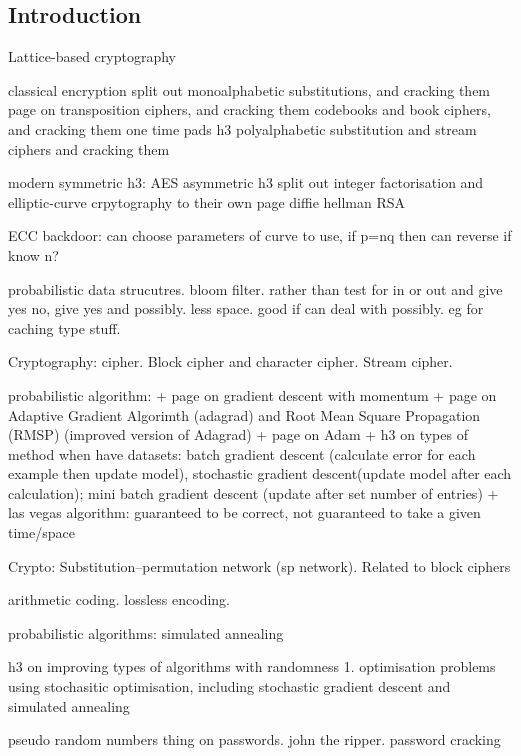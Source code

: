 
\subsection{Introduction}

Lattice-based cryptography

classical encryption
	split out monoalphabetic substitutions, and cracking them
	page on transposition ciphers, and cracking them
	codebooks and book ciphers, and cracking them
	one time pads
h3 polyalphabetic substitution and stream ciphers and cracking them

modern symmetric h3:
	AES
asymmetric h3
	split out integer factorisation and elliptic-curve crpytography to their own page
	diffie hellman
	RSA

ECC backdoor: can choose parameters of curve to use, if p=nq then can reverse if know n?


probabilistic data strucutres.
bloom filter.
rather than test for in or out and give yes no, give yes and possibly. less space. good if can deal with possibly. eg for caching type stuff.

Cryptography: cipher. Block cipher and character cipher. Stream cipher.

probabilistic algorithm:
+ page on gradient descent with momentum
+ page on Adaptive Gradient Algorimth (adagrad) and Root Mean Square Propagation (RMSP) (improved version of Adagrad)
+ page on Adam
+ h3 on types of method when have datasets: batch gradient descent (calculate error for each example then update model), stochastic gradient descent(update model after each calculation); mini batch gradient descent (update after set number of entries)
+ las vegas algorithm: guaranteed to be correct, not guaranteed to take a given time/space



Crypto: Substitution–permutation network (sp network). Related to block ciphers

arithmetic coding. lossless encoding.


probabilistic algorithms: simulated annealing

h3 on improving types of algorithms with randomness
1. optimisation problems using stochasitic optimisation, including stochastic gradient descent and simulated annealing

pseudo random numbers
thing on passwords. john the ripper. password cracking


